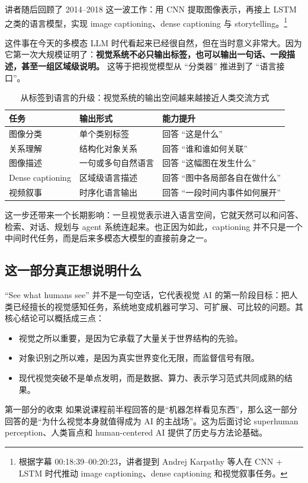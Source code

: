 讲者随后回顾了 2014--2018 这一波工作：用 CNN 提取图像表示，再接上 LSTM 之类的语言模型，实现 image captioning、dense captioning 与 storytelling。\footnote{根据字幕 00:18:39--00:20:23，讲者提到 Andrej Karpathy 等人在 CNN + LSTM 时代推动 image captioning、dense captioning 和视觉叙事任务。}

这件事在今天的多模态 LLM 时代看起来已经很自然，但在当时意义非常大。因为它第一次大规模证明了：\textbf{视觉系统不必只输出标签，也可以输出一句话、一段描述，甚至一组区域级说明。} 这等于把视觉模型从 ``分类器'' 推进到了 ``语言接口''。

\begin{table}[H]
\centering
\begin{tabular}{p{3.2cm}p{4.4cm}p{6.0cm}}
\toprule
\textbf{任务} & \textbf{输出形式} & \textbf{能力提升} \\
\midrule
图像分类 & 单个类别标签 & 回答 ``这是什么'' \\
关系理解 & 结构化对象关系 & 回答 ``谁和谁如何关联'' \\
图像描述 & 一句或多句自然语言 & 回答 ``这幅图在发生什么'' \\
Dense captioning & 区域级语言描述 & 回答 ``图中各局部各自在做什么'' \\
视频叙事 & 时序化语言输出 & 回答 ``一段时间内事件如何展开'' \\
\bottomrule
\end{tabular}
\caption{从标签到语言的升级：视觉系统的输出空间越来越接近人类交流方式}
\end{table}

这一步还带来一个长期影响：一旦视觉表示进入语言空间，它就天然可以和问答、检索、对话、规划与 agent 系统连起来。也正因为如此，captioning 并不只是一个中间时代任务，而是后来多模态大模型的直接前身之一。

\subsection{这一部分真正想说明什么}

``See what humans see'' 并不是一句空话，它代表视觉 AI 的第一阶段目标：把人类已经擅长的视觉感知任务，系统地变成机器可学习、可扩展、可比较的问题。其核心结论可以概括成三点：

\begin{itemize}
    \item 视觉之所以重要，是因为它承载了大量关于世界结构的先验。
    \item 对象识别之所以难，是因为真实世界变化无限，而监督信号有限。
    \item 现代视觉突破不是单点发明，而是数据、算力、表示学习范式共同成熟的结果。
\end{itemize}

\begin{importantbox}{第一部分的收束}
如果说课程前半程回答的是``机器怎样看见东西''，那么这一部分回答的是``为什么视觉本身就值得成为 AI 的主战场''。这为后面讨论 superhuman perception、人类盲点和 human-centered AI 提供了历史与方法论基础。
\end{importantbox}

